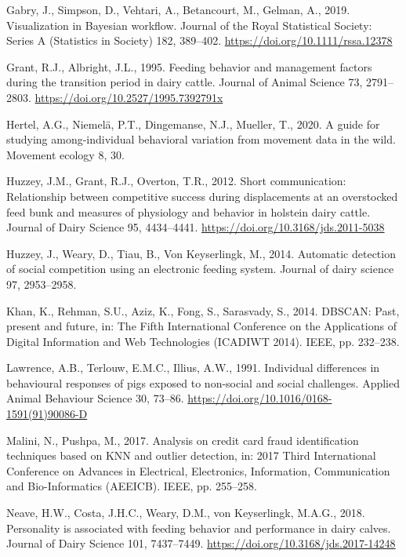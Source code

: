 \documentclass[
]{article}
\newlength{\cslhangindent}
\newenvironment{CSLReferences}[2] %
 {\begin{list}{}{%
  \setlength{\itemindent}{0pt}
  \setlength{\leftmargin}{0pt}
  \setlength{\parsep}{0pt}
  \ifodd #1
   \setlength{\leftmargin}{\cslhangindent}
   \setlength{\itemindent}{-1\cslhangindent}
  \fi
  \setlength{\itemsep}{#2\baselineskip}}}
 {\end{list}}
\begin{document}
\begin{CSLReferences}{1}{0}
Gabry, J., Simpson, D., Vehtari, A., Betancourt, M., Gelman, A., 2019.
Visualization in {Bayesian} workflow. Journal of the Royal Statistical
Society: Series A (Statistics in Society) 182, 389--402.
\url{https://doi.org/10.1111/rssa.12378}

Grant, R.J., Albright, J.L., 1995. Feeding behavior and management
factors during the transition period in dairy cattle. Journal of Animal
Science 73, 2791--2803. \url{https://doi.org/10.2527/1995.7392791x}

Hertel, A.G., Niemelä, P.T., Dingemanse, N.J., Mueller, T., 2020. A
guide for studying among-individual behavioral variation from movement
data in the wild. Movement ecology 8, 30.

Huzzey, J.M., Grant, R.J., Overton, T.R., 2012. Short communication:
Relationship between competitive success during displacements at an
overstocked feed bunk and measures of physiology and behavior in
holstein dairy cattle. Journal of Dairy Science 95, 4434--4441.
\url{https://doi.org/10.3168/jds.2011-5038}

Huzzey, J., Weary, D., Tiau, B., Von Keyserlingk, M., 2014. Automatic
detection of social competition using an electronic feeding system.
Journal of dairy science 97, 2953--2958.

Khan, K., Rehman, S.U., Aziz, K., Fong, S., Sarasvady, S., 2014. DBSCAN:
Past, present and future, in: The Fifth International Conference on the
Applications of Digital Information and Web Technologies (ICADIWT 2014).
IEEE, pp. 232--238.

Lawrence, A.B., Terlouw, E.M.C., Illius, A.W., 1991. Individual
differences in behavioural responses of pigs exposed to non-social and
social challenges. Applied Animal Behaviour Science 30, 73--86.
\url{https://doi.org/10.1016/0168-1591(91)90086-D}

Malini, N., Pushpa, M., 2017. Analysis on credit card fraud
identification techniques based on KNN and outlier detection, in: 2017
Third International Conference on Advances in Electrical, Electronics,
Information, Communication and Bio-Informatics (AEEICB). IEEE, pp.
255--258.

Neave, H.W., Costa, J.H.C., Weary, D.M., von Keyserlingk, M.A.G., 2018.
Personality is associated with feeding behavior and performance in dairy
calves. Journal of Dairy Science 101, 7437--7449.
\url{https://doi.org/10.3168/jds.2017-14248}


\end{CSLReferences}
\end{document}

